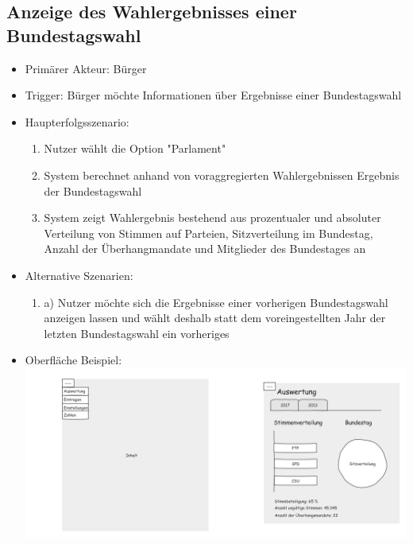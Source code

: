 \documentclass[a4paper]{scrreprt}
\begin{document}
\subsection{Anzeige des Wahlergebnisses einer Bundestagswahl}
\begin{itemize}
\item Primärer Akteur: Bürger
\item Trigger: Bürger möchte Informationen über Ergebnisse einer Bundestagswahl
\item Haupterfolgsszenario:
\begin{enumerate}
\item Nutzer wählt die Option "Parlament"
\item System berechnet anhand von voraggregierten Wahlergebnissen Ergebnis der Bundestagswahl
\item System zeigt Wahlergebnis bestehend aus prozentualer und absoluter Verteilung von Stimmen auf Parteien, Sitzverteilung im Bundestag, Anzahl der Überhangmandate und Mitglieder des Bundestages an
\end{enumerate}
\item Alternative Szenarien:
\begin{enumerate}
\item a) Nutzer möchte sich die Ergebnisse einer vorherigen Bundestagswahl anzeigen lassen und wählt deshalb statt dem voreingestellten Jahr der letzten Bundestagswahl ein vorheriges 
\end{enumerate}
\item Oberfläche Beispiel: \\
\includegraphics[width=\textwidth]{images/gesamt.png}
\end{itemize}
\end{document}
